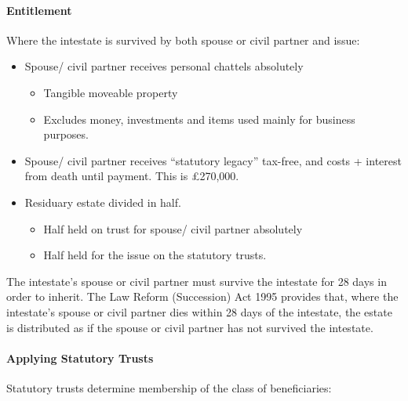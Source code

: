 \documentclass[
]{article}
\providecommand{\tightlist}{%
  \setlength{\itemsep}{0pt}\setlength{\parskip}{0pt}}
\begin{document}
\hypertarget{entitlement}{%
\paragraph{Entitlement}\label{entitlement}}

Where the intestate is survived by both spouse or civil partner and
issue:

\begin{itemize}
\tightlist
\item
  Spouse/ civil partner receives personal chattels absolutely

  \begin{itemize}
  \tightlist
  \item
    Tangible moveable property
  \item
    Excludes money, investments and items used mainly for business
    purposes.
  \end{itemize}
\item
  Spouse/ civil partner receives ``statutory legacy'' tax-free, and
  costs + interest from death until payment. This is £270,000.
\item
  Residuary estate divided in half.

  \begin{itemize}
  \tightlist
  \item
    Half held on trust for spouse/ civil partner absolutely
  \item
    Half held for the issue on the statutory trusts.
  \end{itemize}
\end{itemize}

The intestate's spouse or civil partner must survive the intestate for
28 days in order to inherit. The Law Reform (Succession) Act 1995
provides that, where the intestate's spouse or civil partner dies within
28 days of the intestate, the estate is distributed as if the spouse or
civil partner has not survived the intestate.

\hypertarget{applying-statutory-trusts}{%
\paragraph{Applying Statutory Trusts}\label{applying-statutory-trusts}}

Statutory trusts determine membership of the class of beneficiaries:
\end{document}

